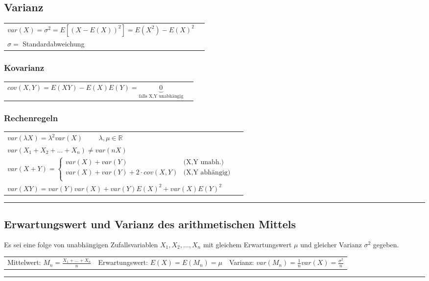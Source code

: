 \begin{minipage}{9cm}
\subsection{Varianz }
  \begin{tabular}{ll}
    $var(X)=\sigma ^2=E[(X-E(X))^2]=E(X^2)-E(X)^2$\\
    $\sigma = $ Standardabweichung\\
	\end{tabular}
	\subsubsection{Kovarianz}
	\begin{tabular}{ll}
	  $cov(X,Y)=E(XY)-E(X)E(Y)=\underbrace{0}_{\text{falls X,Y unabhängig}}$
	\end{tabular}
\end{minipage}
\begin{minipage}{9cm}
  \subsubsection{Rechenregeln}
  \begin{tabular}{ll}
    $var(\lambda X)=\lambda^2 var(X) \qquad $ $\lambda, \mu
    \in \mathbb{R}$\\
    $var(X_1+X_2+\ldots+X_n) \neq var(n X)$ \\
    $var(X+Y)= \begin{cases}
      var(X)+var(Y)                      &	\text{(X,Y unabh.)}\\                     
      var(X) + var(Y) + 2 \cdot cov(X,Y) &	\text{(X,Y abhängig)}\\
    \end{cases} $ \\
    $var(X Y)= var(Y)var(X)+var(Y)E(X)^2+var(X)E(Y)^2$
  \end{tabular}
\end{minipage}
\vspace{1mm}
\hrule

\subsection{Erwartungswert und Varianz des arithmetischen Mittels }
Es sei eine folge von unabhängigen Zufallsvariablen $X_1, X_2, \ldots , X_n$ mit
gleichem Erwartungswert $ \mu $ und gleicher Varianz $ \sigma^2 $ gegeben. \\
\begin{tabular}{p{6cm} p{6cm} p{6cm}}
  Mittelwert: $M_n=\frac{X_1+\ldots+X_n}{n}$ &
  Erwartungswert: $E(X)=E(M_n) = \mu$  &
  Varianz: $var(M_n)=\frac{1}{n}var(X) = \frac{\sigma ^2}{n} $
\end{tabular}
\vspace{1mm}
\hrule

